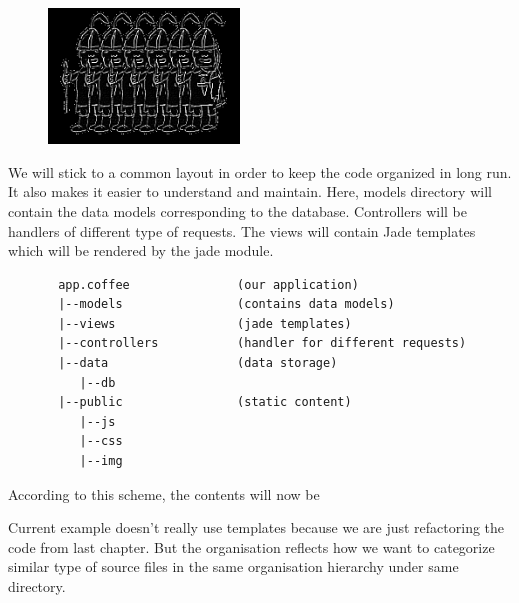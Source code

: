 \documentclass[12pt]{book}
\begin{document}
\begin{figure}
\begin{center}\includegraphics[width=2in]{org/art/organized.png}\end{center}
\end{figure}

We will stick to a common layout in order to keep the code organized in long run. It also makes it easier to understand and maintain. Here, models directory will contain the data models corresponding to the database. Controllers will be handlers of different type of requests. The views will contain Jade templates which will be rendered by the jade module.
\linebreak

\begin{verbatim}
       app.coffee               (our application)
       |--models                (contains data models)
       |--views                 (jade templates)
       |--controllers           (handler for different requests)
       |--data                  (data storage)
          |--db
       |--public                (static content)
          |--js
          |--css
          |--img
\end{verbatim}

\par
\vspace{1cm}

According to this scheme, the contents will now be\\
\vspace{0.6cm}
\vspace{0.6cm}
\vspace{0.6cm}
\vspace{0.6cm}

Current example doesn't really use templates because we are just refactoring the code from last chapter. But the organisation reflects how we want to categorize similar type of source files in the same organisation hierarchy under same directory.


\end{document}
